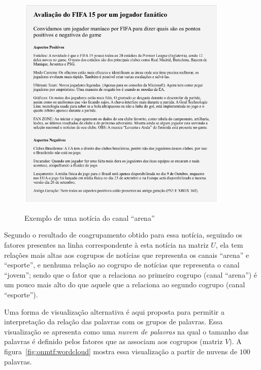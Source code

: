 \documentclass[
    12pt,                %
    oneside,            %
    a4paper,            %
    english,            %
    brazil                %
    ]{abntex2ppgsi}
\begin{document}
\begin{figure}[H]
    \centering
    \caption{Exemplo de uma notícia do canal ``arena''}
    \includegraphics[width=0.90\textwidth]{img/arenaNews.png}
    \label{fig:sample-news}
\end{figure}

Segundo o resultado de coagrupamento obtido para essa notícia, seguindo os fatores presentes na linha correspondente à esta notícia na matriz $U$, ela tem relações mais altas aos cogrupos de notícias que representa os canais ``arena'' e ``esporte'', e nenhuma relação ao cogrupo de notícias que representa o canal ``jovem''; sendo que o fator que a relaciona ao primeiro cogrupo (canal ``arena'') é um pouco mais alto do que aquele que a relaciona ao segundo cogrupo (canal ``esporte'').


Uma forma de visualização alternativa é aqui proposta para permitir a interpretação da relação das palavras com os grupos de palavras. Essa visualização se apresenta como uma \textit{nuvem de palavras} na qual o tamanho das palavras é definido pelos fatores que as associam aos cogrupos (matriz $V$).
A figura~\ref{fig:onmtf:wordcloud} mostra essa visualização a partir de nuvens de $100$ palavras.
\end{document}
